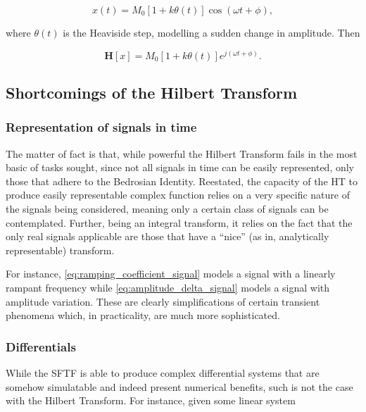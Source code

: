 \begin{equation} x(t) = M_0\left[1 + k\theta(t)\right]\cos \left(\omega t + \phi\right), \end{equation}

	\noindent where $\theta(t)$ is the Heaviside step, modelling a sudden change in amplitude. Then

\begin{equation} \mathbf{H}\left[x\right] = M_0\left[1 + k\theta(t)\right] e^{j\left(\omega t + \phi\right)}. \label{eq:amplitude_delta_signal}\end{equation}

\subsection{Shortcomings of the Hilbert Transform} %

\subsubsection{Representation of signals in time}

	The matter of fact is that, while powerful the Hilbert Transform fails in the most basic of tasks sought, since not all signals in time can be easily represented, only those that adhere to the Bedrosian Identity. Reestated, the capacity of the HT to produce easily representable complex function relies on a very specific nature of the signals being considered, meaning only a certain class of signals can be contemplated. Further, being an integral transform, it relies on the fact that the only real signals applicable are those that have a ``nice'' (as in, analytically representable) transform.

	For instance, \eqref{eq:ramping_coefficient_signal} models a signal with a linearly rampant frequency while \eqref{eq:amplitude_delta_signal} models a signal with amplitude variation. These are clearly simplifications of certain transient phenomena which, in practicality, are much more sophisticated.

\subsubsection{Differentials}

	While the SFTF is able to produce complex differential systems that are somehow simulatable and indeed present numerical benefits, such is not the case with the Hilbert Transform. For instance, given some linear system

